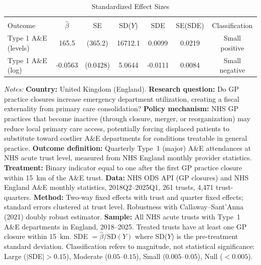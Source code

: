 \begin{table}[t]
\centering
\caption{Standardized Effect Sizes}
\label{tab:sde}
\begin{tabular}{lcccccc}
\hline\hline
\\[-1.8ex]
Outcome & $\hat{\beta}$ & SE & SD($Y$) & SDE & SE(SDE) & Classification \\
\hline
Type 1 A\&E (levels) & 165.5 & (365.2) & 16712.1 & 0.0099 & 0.0219 & Small positive \\
Type 1 A\&E (log) & -0.0563 & (0.0428) & 5.0644 & -0.0111 & 0.0084 & Small negative \\
\hline\hline
\end{tabular}
\begin{tablenotes}
\small
\item \textit{Notes:} \textbf{Country:} United Kingdom (England). \textbf{Research question:} Do GP practice closures increase emergency department utilization, creating a fiscal externality from primary care consolidation? \textbf{Policy mechanism:} NHS GP practices that become inactive (through closure, merger, or reorganization) may reduce local primary care access, potentially forcing displaced patients to substitute toward costlier A\&E departments for conditions treatable in general practice. \textbf{Outcome definition:} Quarterly Type~1 (major) A\&E attendances at NHS acute trust level, measured from NHS England monthly provider statistics. \textbf{Treatment:} Binary indicator equal to one after the first GP practice closure within 15~km of the A\&E trust. \textbf{Data:} NHS ODS API (GP closures) and NHS England A\&E monthly statistics, 2018Q2--2025Q1, 261 trusts, 4,471 trust-quarters. \textbf{Method:} Two-way fixed effects with trust and quarter fixed effects; standard errors clustered at trust level. Robustness with Callaway--Sant'Anna (2021) doubly robust estimator. \textbf{Sample:} All NHS acute trusts with Type~1 A\&E departments in England, 2018--2025. Treated trusts have at least one GP closure within 15~km. SDE $= \hat{\beta} / \text{SD}(Y)$ where SD($Y$) is the pre-treatment standard deviation. Classification refers to magnitude, not statistical significance: Large ($|$SDE$| > 0.15$), Moderate ($0.05$--$0.15$), Small ($0.005$--$0.05$), Null ($< 0.005$).
\end{tablenotes}
\end{table}

